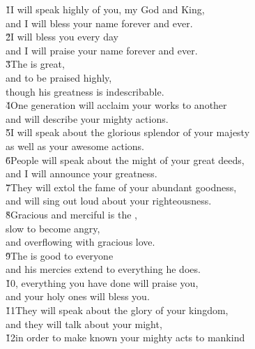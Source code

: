 \begin{poetry}
\poeml \v{1}I will speak highly of you, my God and King, \\
\poemll    and I will bless your name forever and ever. \\
\poeml \v{2}I will bless you every day \\
\poemll    and I will praise your name forever and ever. \\
\poeml \v{3}The  is great, \\
\poemll    and to be praised highly, \\
\poemlll       though his greatness is indescribable. \\
\poeml \v{4}One generation will acclaim your works to another \\
\poemll    and will describe your mighty actions. \\
\poeml \v{5}I will speak about the glorious splendor of your majesty \\
\poemll    as well as your awesome actions. \\
\poeml \v{6}People will speak about the might of your great deeds, \\
\poemll    and I will announce your greatness. \\
\poeml \v{7}They will extol the fame of your abundant goodness, \\
\poemll    and will sing out loud about your righteousness. \\
\poeml \v{8}Gracious and merciful is the , \\
\poemll    slow to become angry, \\
\poemlll       and overflowing with gracious love. \\
\poeml \v{9}The  is good to everyone \\
\poemll    and his mercies extend to everything he does. \\
\poeml \v{10}, everything you have done will praise you, \\
\poemll    and your holy ones will bless you. \\
\poeml \v{11}They will speak about the glory of your kingdom, \\
\poemll    and they will talk about your might, \\
\poeml \v{12}in order to make known your mighty acts to mankind \\

\end{poetry}
